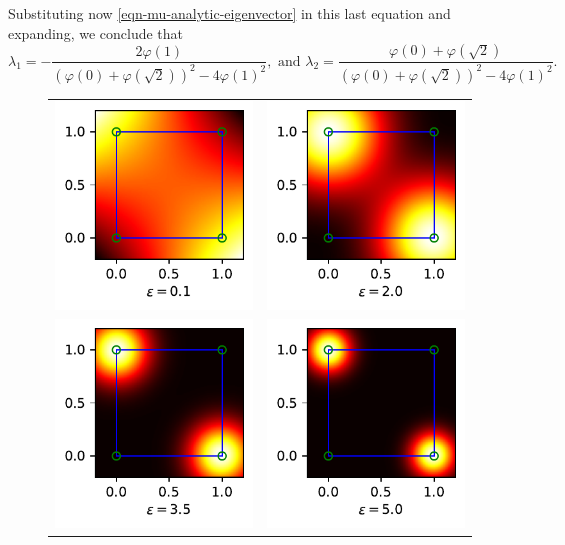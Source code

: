 \documentclass[12pt]{report} %
\begin{document}
Substituting now \eqref{eqn-mu-analytic-eigenvector} in this last equation and expanding, we
conclude that \begin{equation}
  \lambda_1 = - \frac{2 \varphi (1)}{\left( \varphi (0) + \varphi
    \left( \sqrt{2} \right) \right)^2 - 4 \varphi (1)^2}, \text{ and } \lambda_2 =
  \frac{\varphi (0) + \varphi \left( \sqrt{2} \right)}{\left( \varphi (0) +
    \varphi \left( \sqrt{2} \right) \right)^2 - 4 \varphi (1)^2}.
  \label{eqn-lda1-lda2}
\end{equation}

\begin{figure}[ht]
  \centering
  \begin{tabular}{ll}
    {\includegraphics[width=.33\textwidth]{imagenes/xor/xor0.1.pdf}} & \includegraphics[width=.33\textwidth]{imagenes/xor/xor2.0.pdf} \\
    \includegraphics[width=.33\textwidth]{imagenes/xor/xor3.5.pdf}   & \includegraphics[width=.33\textwidth]{imagenes/xor/xor5.0.pdf}

\end{tabular}
\end{figure}
\end{document}
